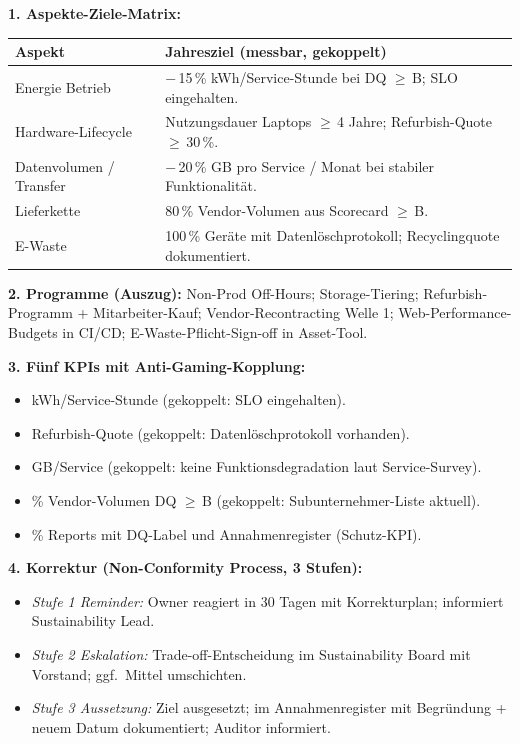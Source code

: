 \documentclass[11pt,a4paper,oneside]{article}
\begin{document}
\begin{loesungbox}
\textbf{1. Aspekte-Ziele-Matrix:}

\smallskip
\begin{tabularx}{\linewidth}{@{}p{3.4cm}X@{}}
\toprule
\textbf{Aspekt} & \textbf{Jahresziel (messbar, gekoppelt)} \\
\midrule
Energie Betrieb       & $-$\,15\,\% kWh/Service-Stunde bei DQ $\geq$\,B; SLO eingehalten. \\
Hardware-Lifecycle    & Nutzungsdauer Laptops $\geq$\,4 Jahre; Refurbish-Quote $\geq$\,30\,\%. \\
Datenvolumen / Transfer & $-$\,20\,\% GB pro Service / Monat bei stabiler Funktionalit\"at. \\
Lieferkette           & 80\,\% Vendor-Volumen aus Scorecard $\geq$\,B. \\
E-Waste               & 100\,\% Ger\"ate mit Datenl\"oschprotokoll; Recyclingquote dokumentiert. \\
\bottomrule
\end{tabularx}

\smallskip
\textbf{2. Programme (Auszug):} Non-Prod Off-Hours; Storage-Tiering; Refurbish-Programm + Mitarbeiter-Kauf; Vendor-Recontracting Welle 1; Web-Performance-Budgets in CI/CD; E-Waste-Pflicht-Sign-off in Asset-Tool.

\smallskip
\textbf{3. F\"unf KPIs mit Anti-Gaming-Kopplung:}
\begin{itemize}
  \item kWh/Service-Stunde (gekoppelt: SLO eingehalten).
  \item Refurbish-Quote (gekoppelt: Datenl\"oschprotokoll vorhanden).
  \item GB/Service (gekoppelt: keine Funktions\-degradation laut Service-Survey).
  \item \% Vendor-Volumen DQ $\geq$\,B (gekoppelt: Subunternehmer-Liste aktuell).
  \item \% Reports mit DQ-Label und Annahmenregister (Schutz-KPI).
\end{itemize}

\smallskip
\textbf{4. Korrektur (Non-Conformity Process, 3 Stufen):}
\begin{itemize}
  \item \emph{Stufe 1 Reminder:} Owner reagiert in 30 Tagen mit Korrekturplan; informiert Sustainability Lead.
  \item \emph{Stufe 2 Eskalation:} Trade-off-Entscheidung im Sustainability Board mit Vorstand; ggf.\ Mittel umschichten.
  \item \emph{Stufe 3 Aussetzung:} Ziel ausgesetzt; im Annahmenregister mit Begr\"undung + neuem Datum dokumentiert; Auditor informiert.
\end{itemize}


\end{loesungbox}
\end{document}
